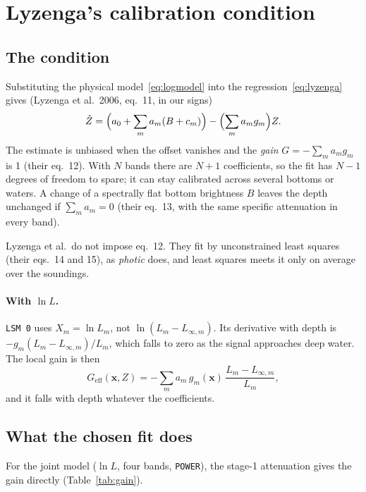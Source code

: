 \documentclass[11pt]{article}
\numberwithin{equation}{section}
\newcommand{\bx}{\mathbf{x}}
\newcommand{\code}[1]{\texttt{#1}}
\newcommand{\Lsm}[1]{L_{\infty,#1}}
\begin{document}
\section{Lyzenga's calibration condition}
\label{sec:calibration}

\subsection{The condition}

Substituting the physical model~\eqref{eq:logmodel} into the regression~\eqref{eq:lyzenga} gives
(Lyzenga et al.\ 2006, eq.~11, in our signs)
\begin{equation}
  \hat Z = \Bigl(a_0 + \sum_m a_m (B + c_m)\Bigr) - \Bigl(\sum_m a_m g_m\Bigr) Z .
  \label{eq:gain}
\end{equation}
The estimate is unbiased when the offset vanishes and the \emph{gain} $G = -\sum_m a_m g_m$ is 1
(their eq.~12). With $N$ bands there are $N+1$ coefficients, so the fit has $N-1$ degrees of
freedom to spare; it can stay calibrated across several bottoms or waters. A change of a
spectrally flat bottom brightness $B$ leaves the depth unchanged if $\sum_m a_m = 0$ (their
eq.~13, with the same specific attenuation in every band).

Lyzenga et al.\ do not impose eq.~12. They fit by unconstrained least squares (their eqs.~14 and 15),
as \textit{photic} does, and least squares meets it only on average over the soundings.

\paragraph{With $\ln L$.} \code{LSM 0} uses $X_m = \ln L_m$, not $\ln(L_m - \Lsm{m})$. Its
derivative with depth is $-g_m (L_m - \Lsm{m})/L_m$, which falls to zero as the signal approaches
deep water. The local gain is then
\begin{equation}
  G_{\mathrm{eff}}(\bx, Z) = -\sum_m a_m\, g_m(\bx)\, \frac{L_m - \Lsm{m}}{L_m},
\end{equation}
and it falls with depth whatever the coefficients.

\subsection{What the chosen fit does}

For the joint model ($\ln L$, four bands, \code{POWER}), the stage-1 attenuation gives the gain
directly (Table~\ref{tab:gain}).
\end{document}
